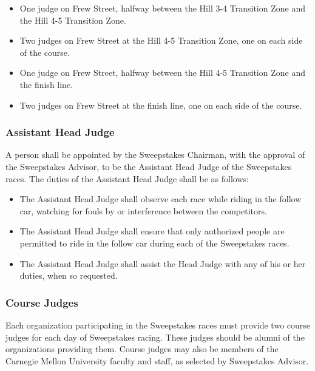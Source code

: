 \begin{itemize}
		\item One judge on Frew Street, halfway between the Hill 3-4 Transition
		Zone and the Hill 4-5 Transition Zone.

		\item Two judges on Frew Street at the Hill 4-5 Transition Zone, one on
		each side of the course.

		\item One judge on Frew Street, halfway between the Hill 4-5 Transition
		Zone and the finish line.

		\item Two judges on Frew Street at the finish line, one on each side of the
		course.

	\end{itemize}

\subsubsection{Assistant Head Judge}

	A person shall be appointed by the Sweepstakes Chairman, with the approval of
	the Sweepstakes Advisor, to be the Assistant Head Judge of the Sweepstakes
	races. The duties of the Assistant Head Judge shall be as follows:

	\begin{itemize}

		\item The Assistant Head Judge shall observe each race while riding in the
		follow car, watching for fouls by or interference between the competitors.

		\item The Assistant Head Judge shall ensure that only authorized people are
		permitted to ride in the follow car during each of the Sweepstakes races.

		\item The Assistant Head Judge shall assist the Head Judge with any of his
		or her duties, when so requested.

	\end{itemize}

\subsubsection{Course Judges}

	Each organization participating in the Sweepstakes races must provide two
	course judges for each day of Sweepstakes racing. These judges should be alumni
	of the organizations providing them. Course judges may also be members of the
	Carnegie Mellon University faculty and staff, as selected by Sweepstakes
	Advisor.


